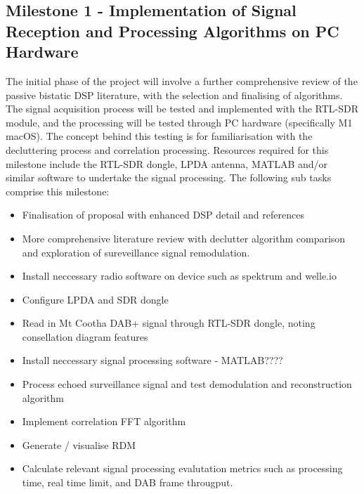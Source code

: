 \documentclass[12pt,a4paper]{article}
\begin{document}
\subsection{Milestone 1 - Implementation of Signal Reception and Processing Algorithms on PC Hardware}
The initial phase of the project will involve a further comprehensive review of the passive bistatic DSP literature, with the selection and finalising of algorithms. The signal acquisition process will be tested and implemented with the RTL-SDR module, and the processing will be tested through PC hardware (specifically M1 macOS). The concept behind this testing is for familiarisation with the decluttering process and correlation processing. Resources required for this milestone include the RTL-SDR dongle, LPDA antenna, MATLAB and/or similar software to undertake the signal processing. The following sub tasks comprise this milestone:
\begin{multicols}{2}
    \begin{itemize}
    \item Finalisation of proposal with enhanced DSP detail and references
    \item More comprehensive literature review with declutter algorithm comparison and exploration of sureveillance signal remodulation.
    \item Install neccessary radio software on device such as spektrum and welle.io
    \item Configure LPDA and SDR dongle
    \item Read in Mt Cootha DAB+ signal through RTL-SDR dongle, noting consellation diagram features
    \item Install neccessary signal processing software - MATLAB???? 
    \item Process echoed surveillance signal and test demodulation and reconstruction algorithm
    \item Implement correlation FFT algorithm
    \item Generate / visualise RDM
    \item Calculate relevant signal processing evalutation metrics such as processing time, real time limit, and DAB frame througput.
    \end{itemize}
\end{multicols}
\end{document}
